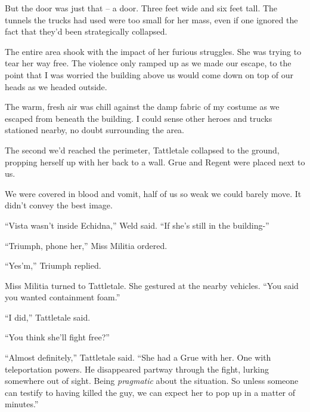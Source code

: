 But the door was just that – a door.  Three feet wide and six feet tall.  The tunnels the trucks had used were too small for her mass, even if one ignored the fact that they'd been strategically collapsed.



The entire area shook with the impact of her furious struggles.  She was trying to tear her way free.  The violence only ramped up as we made our escape, to the point that I was worried the building above us would come down on top of our heads as we headed outside.



The warm, fresh air was chill against the damp fabric of my costume as we escaped from beneath the building.  I could sense other heroes and trucks stationed nearby, no doubt surrounding the area.



The second we'd reached the perimeter, Tattletale collapsed to the ground, propping herself up with her back to a wall.  Grue and Regent were placed next to us.



We were covered in blood and vomit, half of us so weak we could barely move.  It didn't convey the best image.



``Vista wasn't inside Echidna,'' Weld said.  ``If she's still in the building-''



``Triumph, phone her,'' Miss Militia ordered.



``Yes'm,'' Triumph replied.



Miss Militia turned to Tattletale.  She gestured at the nearby vehicles.  ``You said you wanted containment foam.''



``I did,'' Tattletale said.



``You think she'll fight free?''



``Almost definitely,'' Tattletale said.  ``She had a Grue with her.  One with teleportation powers.  He disappeared partway through the fight, lurking somewhere out of sight.  Being \emph{pragmatic} about the situation.  So unless someone can testify to having killed the guy, we can expect her to pop up in a matter of minutes.''



